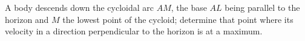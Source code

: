 A body descends down the cycloidal arc $AM$, 
the base $AL$ being parallel to the horizon and $M$
the lowest point of the cycloid; determine that point
where its velocity in a direction perpendicular to the 
horizon is at a maximum.
